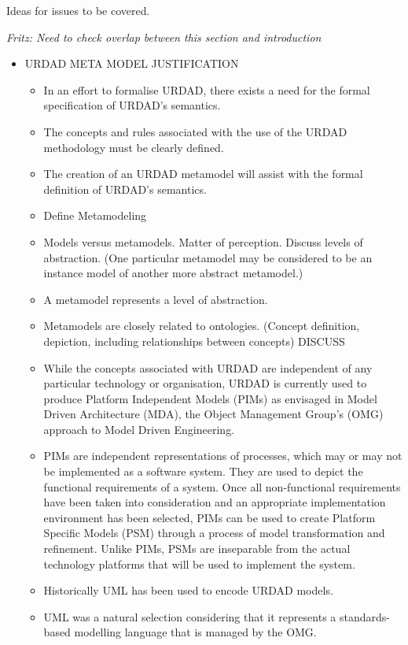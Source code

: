 Ideas for issues to be covered.

{\em Fritz: Need to check overlap between this section and introduction}

\begin{itemize}

	\item URDAD META MODEL JUSTIFICATION
	\begin{itemize}
		\item In an effort to formalise URDAD, there exists a need for the formal specification of URDAD's semantics. 
		\item The concepts and rules associated with the use of the URDAD methodology must be clearly defined.
		\item The creation of an URDAD metamodel will assist with the formal definition of URDAD's semantics.
		\item Define Metamodeling
		\item Models versus metamodels. Matter of perception. Discuss levels of abstraction. (One particular metamodel may be considered to be an instance model of another more abstract metamodel.) 
		\item A metamodel represents a level of abstraction.
		\item	Metamodels are closely related to ontologies. (Concept definition, depiction, including relationships between concepts) DISCUSS
		\item While the concepts associated with URDAD are independent of any particular technology or organisation, URDAD is currently used to produce Platform Independent Models (PIMs) as envisaged in Model Driven Architecture (MDA), the Object Management Group's (OMG) approach to Model Driven Engineering. 
		\item PIMs are independent representations of processes, which may or may not be implemented as a software system. They are used to depict the functional requirements of a system. Once all non-functional requirements have been taken into consideration and an appropriate implementation environment has been selected, PIMs can be used to create Platform Specific Models (PSM) through a process of model transformation and refinement. Unlike PIMs, PSMs are inseparable from the actual technology platforms that will be used to implement the system.
		\item	Historically UML has been used to encode URDAD models. 
		\item	UML was a natural selection considering that it represents a standards-based modelling language that is managed by the OMG.

\end{itemize}
\end{itemize}
